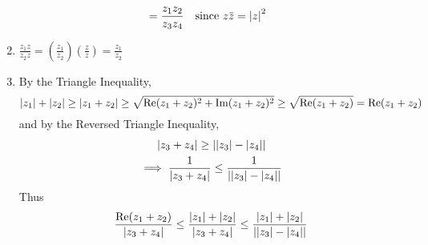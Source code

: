 \documentclass[11pt, oneside]{book}
\begin{document}
\begin{enumerate}
\begin{align*}
			&= \frac{z_1 z_2}{z_3 z_4} \quad \text{since } z\bar{z} = \abs{z}^2
	\end{align*}
	\item $\frac{z_1 z}{z_2 z} = \left( \frac{z_1}{z_2} \right) \left(\frac{z}{z} \right) = \frac{z_1}{z_2}$
	\item By the Triangle Inequality,
	\begin{equation*}
		\left|z_1\right| + \left|z_2\right| \geq \left|z_1 + z_2\right| \geq \sqrt{\operatorname{Re}(z_1 + z_2)^2 + \operatorname{Im}(z_1 + z_2)^2} \geq \sqrt{\operatorname{Re}(z_1 + z_2)} = \operatorname{Re}(z_1 + z_2)
	\end{equation*}
	and by the Reversed Triangle Inequality,
	\begin{gather*}
		\left|z_3 + z_4\right| \geq \left|\left|z_3\right| - \left|z_4\right|\right| \\
		\implies \frac{1}{\left|z_3 + z_4\right|} \leq \frac{1}{\left|\left|z_3\right| - \left|z_4\right|\right|} 
	\end{gather*}
	Thus
	\begin{equation*}
		\frac{\operatorname{Re}(z_1 + z_2)}{\left|z_3 + z_4\right|} \leq \frac{\left|z_1\right| + \left|z_2\right|}{\left|z_3 + z_4\right|} \leq \frac{\left|z_1\right| + \left|z_2\right|}{\left|\left|z_3\right| - \left|z_4\right|\right|}
	\end{equation*}
\end{enumerate}



\end{document}
